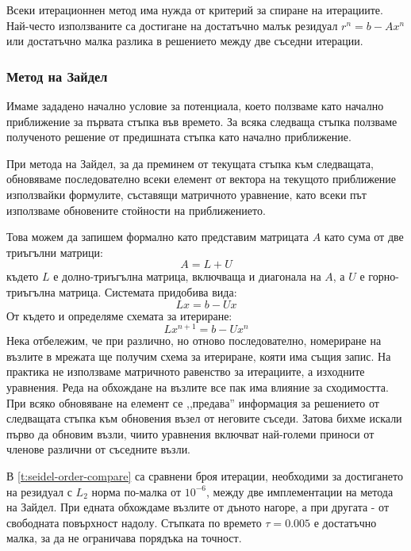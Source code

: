 \documentclass[12pt]{article}
\numberwithin{equation}{section}
\begin{document}
Всеки итерационнен метод има нужда от критерий за спиране на итерациите. Най-често използваните са достигане на достатъчно малък резидуал $r^n=b-Ax^n$ или достатъчно малка разлика в решението между две съседни итерации.

\subsubsection{Метод на Зайдел}
Имаме зададено начално условие за потенциала, което ползваме като начално приближение за първата стъпка във времето. За всяка следваща стъпка ползваме полученото решение от предишната стъпка като начално приближение.

При метода на Зайдел, за да преминем от текущата стъпка към следващата, обновяваме последователно всеки елемент от вектора на текущото приближение използвайки формулите, съставящи матричното уравнение, като всеки път използваме обновените стойности на приближението.

Това можем да запишем формално като представим матрицата $A$ като сума от две триъгълни матрици:
\begin{equation}
    A = L + U
\end{equation}
където $L$ е долно-триъгълна матрица, включваща и диагонала на $A$, а $U$ е горно-триъгълна матрица. Системата придобива вида:
\begin{equation}
    Lx = b - Ux
\end{equation}
От където и определяме схемата за итериране:
\begin{equation}
    Lx^{n+1} = b - Ux^n
\end{equation}
Нека отбележим, че при различно, но отново последователно, номериране на възлите в мрежата ще получим схема за итериране, кояти има същия запис. На практика не използваме матричното равенство за итерациите, а изходните уравнения. Реда на обхождане на възлите все пак има влияние за сходимостта. При всяко обновяване на елемент се ,,предава'' информация за решението от следващата стъпка към обновения възел от неговите съседи. Затова бихме искали първо да обновим възли, чиито уравнения включват най-големи приноси от членове различни от съседните възли.

В \autoref{t:seidel-order-compare} са сравнени броя итерации, необходими за достигането на резидуал с $L_2$ норма по-малка от $10^{-6}$, между две имплементации на метода на Зайдел. При едната обхождаме възлите от дъното нагоре, а при другата - от свободната повърхност надолу. Стъпката по времето $\tau=0.005$ е достатъчно малка, за да не ограничава порядъка на точност.
\end{document}
